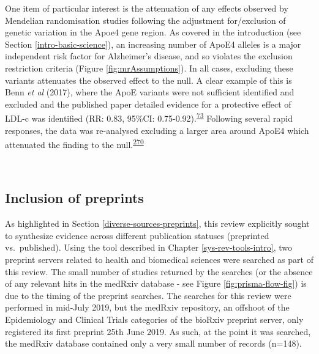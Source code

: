 \documentclass[a4paper, twoside]{templates/ociamthesis}
\begin{document}
One item of particular interest is the attenuation of any effects observed by Mendelian randomisation studies following the adjustment for/exclusion of genetic variation in the Apoe4 gene region. As covered in the introduction (see Section \ref{intro-basic-science}), an increasing number of ApoE4 alleles is a major independent risk factor for Alzheimer's disease, and so violates the exclusion restriction criteria (Figure \ref{fig:mrAssumptions}). In all cases, excluding these variants attenuates the observed effect to the null. A clear example of this is Benn \emph{et al} (2017), where the ApoE variants were not sufficient identified and excluded and the published paper detailed evidence for a protective effect of LDL-c was identified (RR: 0.83, 95\%CI: 0.75-0.92).\textsuperscript{\protect\hyperlink{ref-benn2017}{73}} Following several rapid responses, the data was re-analysed excluding a larger area around ApoE4 which attenuated the finding to the null.\textsuperscript{\protect\hyperlink{ref-benn2017comment}{270}}

~

\hypertarget{inclusion-of-preprints}{%
\subsection{Inclusion of preprints}\label{inclusion-of-preprints}}

As highlighted in Section \ref{diverse-sources-preprints}, this review explicitly sought to synthesize evidence across different publication statuses (preprinted vs.~published). Using the tool described in Chapter \ref{sys-rev-tools-intro}, two preprint servers related to health and biomedical sciences were searched as part of this review. The small number of studies returned by the searches (or the absence of any relevant hits in the medRxiv database - see Figure \ref{fig:prisma-flow-fig}) is due to the timing of the preprint searches. The searches for this review were performed in mid-July 2019, but the medRxiv repository, an offshoot of the Epidemiology and Clinical Trials categories of the bioRxiv preprint server, only registered its first preprint 25th June 2019. As such, at the point it was searched, the medRxiv database contained only a very small number of records (n=148).
\end{document}
